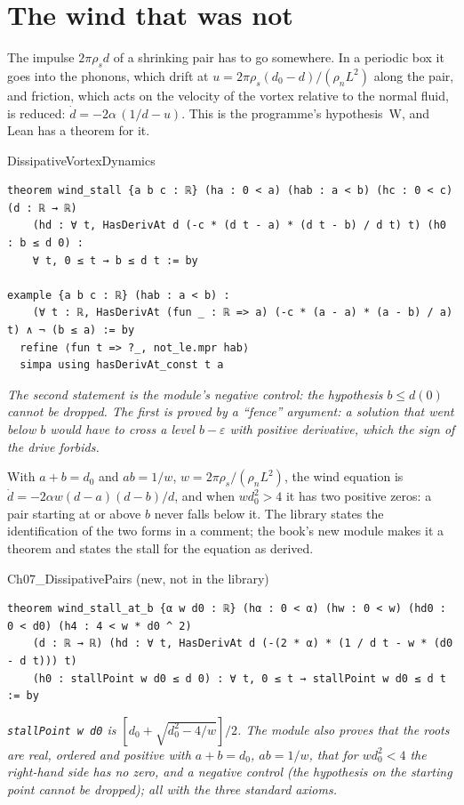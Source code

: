 \section{The wind that was not}\label{ch07:wind}

The impulse $2\pi\rho_sd$ of a shrinking pair has to go somewhere. In a periodic box it goes into the phonons, which drift at $u=2\pi\rho_s(d_0-d)/(\rho_nL^2)$ along the pair, and friction, which acts on the velocity of the vortex relative to the normal fluid, is reduced: $\dot d=-2\alpha\,(1/d-u)$. This is the programme's hypothesis~W, and Lean has a theorem for it.

\begin{leanbox}{DissipativeVortexDynamics}
\begin{lstlisting}[style=lean,basicstyle=\ttfamily\footnotesize]
theorem wind_stall {a b c : ℝ} (ha : 0 < a) (hab : a < b) (hc : 0 < c) (d : ℝ → ℝ)
    (hd : ∀ t, HasDerivAt d (-c * (d t - a) * (d t - b) / d t) t) (h0 : b ≤ d 0) :
    ∀ t, 0 ≤ t → b ≤ d t := by

example {a b c : ℝ} (hab : a < b) :
    (∀ t : ℝ, HasDerivAt (fun _ : ℝ => a) (-c * (a - a) * (a - b) / a) t) ∧ ¬ (b ≤ a) := by
  refine ⟨fun t => ?_, not_le.mpr hab⟩
  simpa using hasDerivAt_const t a
\end{lstlisting}
\nopagebreak[4]\smallskip\noindent\textit{The second statement is the module's negative control: the hypothesis $b\le d(0)$ cannot be dropped. The first is proved by a ``fence'' argument: a solution that went below $b$ would have to cross a level $b-\varepsilon$ with positive derivative, which the sign of the drive forbids.}
\end{leanbox}

With $a+b=d_0$ and $ab=1/w$, $w=2\pi\rho_s/(\rho_nL^2)$, the wind equation is $\dot d=-2\alpha w(d-a)(d-b)/d$, and when $wd_0^2>4$ it has two positive zeros: a pair starting at or above $b$ never falls below it. The library states the identification of the two forms in a comment; the book's new module makes it a theorem and states the stall for the equation as derived.

\begin{leanbox}[unbreakable]{Ch07\_DissipativePairs (new, not in the library)}
\begin{lstlisting}[style=lean,basicstyle=\ttfamily\footnotesize]
theorem wind_stall_at_b {α w d0 : ℝ} (hα : 0 < α) (hw : 0 < w) (hd0 : 0 < d0) (h4 : 4 < w * d0 ^ 2)
    (d : ℝ → ℝ) (hd : ∀ t, HasDerivAt d (-(2 * α) * (1 / d t - w * (d0 - d t))) t)
    (h0 : stallPoint w d0 ≤ d 0) : ∀ t, 0 ≤ t → stallPoint w d0 ≤ d t := by
\end{lstlisting}
\nopagebreak[4]\smallskip\noindent\textit{\texttt{stallPoint w d0} is $[d_0+\sqrt{d_0^2-4/w}]/2$. The module also proves that the roots are real, ordered and positive with $a+b=d_0$, $ab=1/w$, that for $wd_0^2<4$ the right-hand side has no zero, and a negative control (the hypothesis on the starting point cannot be dropped); all with the three standard axioms.}
\end{leanbox}

